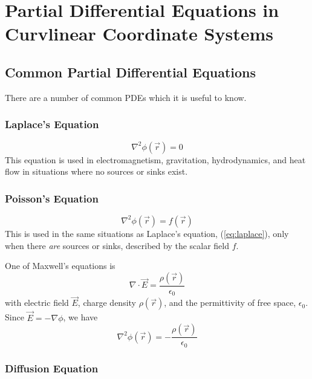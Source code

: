 \section{Partial Differential Equations in Curvlinear Coordinate
  Systems}
\label{sec:curvipde}

\subsection{Common Partial Differential Equations}
\label{sec:commonpdes}

There are a number of common PDEs which it is useful to know.

\subsubsection{Laplace's Equation} \label{sec:laplacepde}

\begin{equation}
  \label{eq:laplace}
  \nabla^2 \phi(\vec{r}) = 0
\end{equation}
This equation is used in electromagnetism, gravitation, hydrodynamics,
and heat flow in situations where no sources or sinks exist.

\subsubsection{Poisson's Equation} \label{sec:poissonpde}

\begin{equation}
  \label{eq:poisson}
  \nabla^2 \phi(\vec{r}) = f(\vec{r})
\end{equation}
This is used in the same situations as Laplace's equation,
(\ref{eq:laplace}), only when there {\em are} sources or sinks,
described by the scalar field $f$.
\begin{example}
  One of Maxwell's equations is
  \[ \nabla \cdot \vec{E} = \frac{\rho(\vec{r})}{\epsilon_{0}} \] with
  electric field $\vec E$, charge density $\rho(\vec r)$, and the
  permittivity of free space, $\epsilon_0$. Since $\vec{E} = - \nabla
  \phi$, we have
  \[ \nabla^2 \phi(\vec{r}) = - \frac{\rho(\vec{r})}{\epsilon_0} \]
\end{example}

\subsubsection{Diffusion Equation} \label{sec:diffusionpde}


